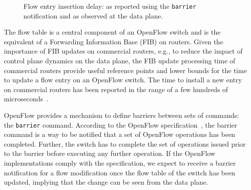 % 
\begin{figure}[t!]
  \begin{center}
  \end{center}
  \caption{Flow entry insertion delay: as reported using the
    \texttt{barrier} notification and as observed at the data
    plane.}
  \label{fig:flow_insertion_comparison}
\end{figure}

The flow table is a central component of an OpenFlow switch and is the
equivalent of a Forwarding Information Base (FIB) on routers. Given the
importance of FIB updates on commercial routers, e.g., to reduce the impact of
control plane dynamics on the data plane, the FIB update processing time of
commercial routers provide useful reference points and lower bounds for the time
to update a flow entry on an OpenFlow switch. The time to install a new entry on
commercial routers has been reported in the range of a few hundreds of
microseconds~\cite{shaikh-igp}.

OpenFlow provides a mechanism to define barriers between sets of
commands: the \texttt{barrier} command. According to the OpenFlow
specification~\cite{openflow-spec}, the barrier command is a way to be
notified that a set of OpenFlow operations has been completed. Further, 
the switch has to complete the set of operations issued prior to the barrier 
before executing any further operation. If the OpenFlow implementations 
comply with the specification, we expect to receive a barrier notification for 
a flow modification once the flow table of the switch has been updated, 
implying that the change can be seen from the data plane.


